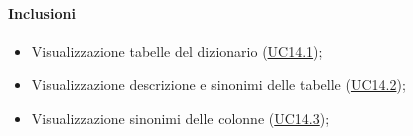 \paragraph*{Inclusioni}
\begin{itemize}
  \item Visualizzazione tabelle del dizionario (\hyperref[UC14point1]{UC14.1});
  \item Visualizzazione descrizione e sinonimi delle tabelle (\hyperref[UC14point2]{UC14.2});
  \item Visualizzazione sinonimi delle colonne (\hyperref[UC14point3]{UC14.3});
\end{itemize}


